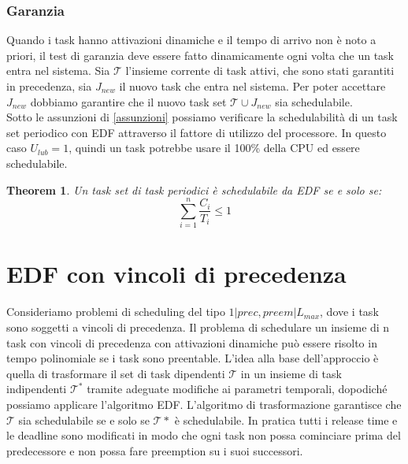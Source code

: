 \documentclass[12pt,openany,onesided]{book}
\newtheorem{theorem}{Theorem}
\begin{document}
\subsubsection{Garanzia}
Quando i task hanno attivazioni dinamiche e il tempo di arrivo non è noto a priori, il test di garanzia deve essere fatto dinamicamente ogni volta che un task entra nel sistema.
Sia $\mathcal{T}$ l'insieme corrente di task attivi, che sono stati garantiti in precedenza, sia $J_{new}$ il nuovo task che entra nel sistema.
Per poter accettare $J_{new}$ dobbiamo garantire che il nuovo task set $\mathcal{T} \cup J_{new}$ sia schedulabile.\\
Sotto le assunzioni di \ref{assunzioni} possiamo verificare la schedulabilità di un task set periodico con EDF attraverso il fattore di utilizzo del processore.
In questo caso $U_{lub}=1$, quindi un task potrebbe usare il 100\% della CPU ed essere schedulabile.
\begin{theorem}
    Un task set di task periodici è schedulabile da EDF se e solo se:
    \begin{equation}
        \sum_{i=1}^{n}\frac{C_i}{T_i}\leq 1
    \end{equation}
\end{theorem}
\section{EDF con vincoli di precedenza}
Consideriamo problemi di scheduling del tipo $1|prec,preem|L_{max}$, dove i task sono soggetti a vincoli di precedenza.
Il problema di schedulare un insieme di n task con vincoli di precedenza con attivazioni dinamiche può essere risolto in tempo polinomiale  se i task sono preentable.
L'idea alla base dell'approccio è quella di trasformare  il set di task dipendenti $\mathcal{T}$ in un insieme di task indipendenti $\mathcal{T}^*$ tramite adeguate modifiche ai parametri temporali, dopodiché possiamo applicare l'algoritmo EDF.
L'algoritmo di trasformazione garantisce che $\mathcal{T}$ sia schedulabile se e solo se $\mathcal{T}*$ è schedulabile. In pratica tutti i release time e le deadline sono modificati in modo che ogni task non possa cominciare prima del predecessore e non possa fare preemption su i suoi successori.
\end{document}
